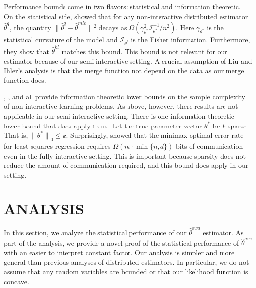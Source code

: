 \documentclass[twoside]{article}
\newcommand{\w}{\theta}
\newcommand{\wkl}{\hat\w^{kl}}
\newcommand{\wowa}{\hat\w^{owa}}
\newcommand{\wave}{\hat\w^{ave}}
\newcommand{\wmle}{\hat\w^{mle}}
\newcommand{\wstar}{{\w^{*}}}
\newcommand{\wq}{\hat\w^{q}}
\newcommand{\I}{\mathcal I}
\newcommand{\ltwo}[1]{{\lVert {#1} \rVert}}
\newcommand{\lzero}[1]{{\lVert {#1} \rVert}_0}
\begin{document}
Performance bounds come in two flavors: statistical and information theoretic.
On the statistical side, \cite{liu2014distributed} showed that for any non-interactive distributed estimator $\wq$,
the quantity $\ltwo{\wq-\wmle}{}^2$ decays as $\Omega(\gamma^2_\wstar \I^{-1}_\wstar/n^2)$.
Here $\gamma_\wstar$ is the statistical curvature of the model and $\I_\wstar$ is the Fisher information.
Furthermore, they show that $\wkl$ matches this bound.
This bound is not relevant for our estimator because of our semi-interactive setting.
A crucial assumption of Liu and Ihler's analysis is that the merge function not depend on the data as our merge function does.

\cite{shamir2014fundamental}, \cite{zhang2013information}, and \cite{garg2014communication} all provide information theoretic lower bounds on the sample complexity of non-interactive learning problems.
As above, however, there results are not applicable in our semi-interactive setting.
There is one information theoretic lower bound that does apply to us.
Let the true parameter vector $\wstar$ be $k$-sparse.
That is, $\lzero{\wstar} \le k$.
Surprisingly, \cite{braverman2015communication} showed that the minimax optimal error rate for least squares regression requires $\Omega(m\cdot\min\{n,d\})$ bits of communication even in the fully interactive setting.
This is important because sparsity does not reduce the amount of communication required, and this bound does apply in our setting.

\section{ANALYSIS}
\label{sec:anal}

In this section, we analyze the statistical performance of our $\wowa$ estimator.
As part of the analysis, we provide a novel proof of the statistical performance of $\wave$ with an easier to interpret constant factor.
Our analysis is simpler and more general than previous analyses of distributed estimators.
In particular, we do not assume that any random variables are bounded
or that our likelihood function is concave.
\end{document}
